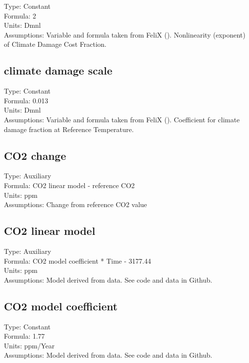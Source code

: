 \documentclass[
  11pt,
]{book}
\begin{document}
Type: Constant\\
Formula: 2\\
Units: Dmnl\\
Assumptions: Variable and formula taken from FeliX (\citet{rydzak_impact_2010}). Nonlinearity (exponent) of Climate Damage Cost Fraction.

\hypertarget{climate-damage-scale}{%
\subsection{climate damage scale}\label{climate-damage-scale}}

Type: Constant\\
Formula: 0.013\\
Units: Dmnl\\
Assumptions: Variable and formula taken from FeliX (\citet{rydzak_impact_2010}). Coefficient for climate damage fraction at Reference Temperature.

\hypertarget{co2-change}{%
\subsection{CO2 change}\label{co2-change}}

Type: Auxiliary\\
Formula: CO2 linear model - reference CO2\\
Units: ppm\\
Assumptions: Change from reference CO2 value

\hypertarget{co2-linear-model}{%
\subsection{CO2 linear model}\label{co2-linear-model}}

Type: Auxiliary\\
Formula: CO2 model coefficient * Time - 3177.44\\
Units: ppm\\
Assumptions: Model derived from data. See code and data in Github.

\hypertarget{co2-model-coefficient}{%
\subsection{CO2 model coefficient}\label{co2-model-coefficient}}

Type: Constant\\
Formula: 1.77\\
Units: ppm/Year\\
Assumptions: Model derived from data. See code and data in Github.
\end{document}
